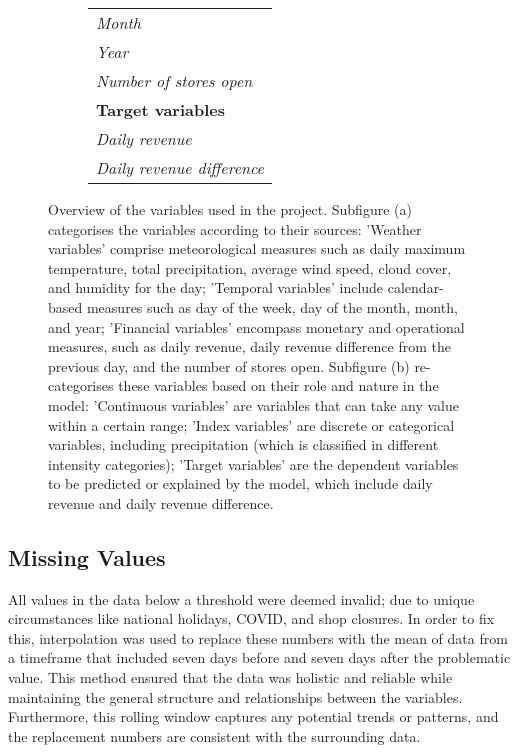 \begin{figure}[h!]
\begin{subfigure}{0.5\textwidth}
\begin{tabular}{l}
          \quad\textit{Month} \\
          \quad\textit{Year} \\
          \quad\textit{Number of stores open} \\[0.3em]
          \textbf{Target variables} \\
          \quad\textit{Daily revenue} \\
          \quad\textit{Daily revenue difference} \\[0.3em]
          \bottomrule
      \end{tabular}
    \end{subfigure}
    \caption{Overview of the variables used in the project. Subfigure (a) categorises the variables according to their sources: 'Weather variables' comprise meteorological measures such as daily maximum temperature, total precipitation, average wind speed, cloud cover, and humidity for the day; 'Temporal variables' include calendar-based measures such as day of the week, day of the month, month, and year; 'Financial variables' encompass monetary and operational measures, such as daily revenue, daily revenue difference from the previous day, and the number of stores open. Subfigure (b) re-categorises these variables based on their role and nature in the model: 'Continuous variables' are variables that can take any value within a certain range; 'Index variables' are discrete or categorical variables, including precipitation (which is classified in different intensity categories); 'Target variables' are the dependent variables to be predicted or explained by the model, which include daily revenue and daily revenue difference.}
    \label{fig:variables}
\end{figure}

\subsection{Missing Values}
\label{subsec:missing-values}

All values in the data below a threshold were deemed invalid; due to unique
circumstances like national holidays, COVID, and shop closures. In order to
fix this, interpolation was used to replace these numbers with the mean of data
from a timeframe that included seven days before and seven days after the
problematic value.
This method ensured that the data was holistic and reliable while maintaining
the general structure and relationships between the variables. 
Furthermore, this rolling window captures any potential trends or patterns, and
the replacement numbers are consistent with the surrounding data.

